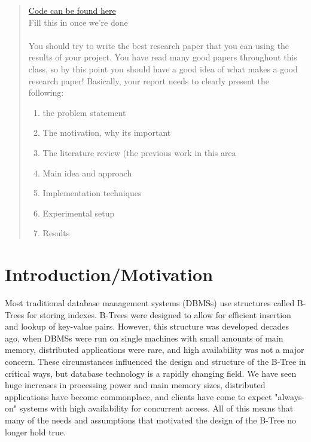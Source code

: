 \documentclass{sig-alternate}
\begin{document}
\date{11 December 2015}

\maketitle
\begin{abstract}
\href{http://github.com/irbowen/b_trees}{Code can be found here}\\
Fill this in once we're done\\ \\
You should try to write the best research paper that you can using the results of your project. You have read many good papers throughout this class, so by this point you should have a good idea of what makes a good research paper! Basically, your report needs to clearly present the following:
\begin{enumerate}
\item the problem statement
\item The motivation, why its important
\item The literature review (the previous work in this area
\item Main idea and approach
\item Implementation techniques
\item Experimental setup
\item Results
\end{enumerate}
\end{abstract}

%
%



\section{Introduction/Motivation}
Most traditional database management systems (DBMSs) use structures called B-Trees for storing indexes. B-Trees were designed to allow for efficient insertion and lookup of key-value pairs. However, this structure was developed decades ago, when DBMSs were run on single machines with small amounts of main memory, distributed applications were rare, and high availability was not a major concern. These circumstances influenced the design and structure of the B-Tree in critical ways, but database technology is a rapidly changing field. We have seen huge increases in processing power and main memory sizes, distributed applications have become commonplace, and clients have come to expect "always-on" systems with high availability for concurrent access. All of this means that many of the needs and assumptions that motivated the design of the B-Tree no longer hold true. 
\end{document}
